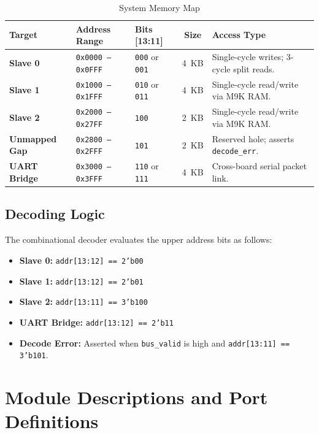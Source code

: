 \documentclass[11pt,a4paper]{article}
\begin{document}
\begin{table}[h!]
\centering
\caption{System Memory Map}
\label{tab:memory_allocation}
\small
\begin{tabularx}{\textwidth}{lllcX}
\toprule
\textbf{Target} & \textbf{Address Range} & \textbf{Bits [13:11]} & \textbf{Size} & \textbf{Access Type} \\
\midrule
\textbf{Slave 0} & \texttt{0x0000 -- 0x0FFF} & \texttt{000} or \texttt{001} & 4~KB & Single-cycle writes; 3-cycle split reads. \\
\textbf{Slave 1} & \texttt{0x1000 -- 0x1FFF} & \texttt{010} or \texttt{011} & 4~KB & Single-cycle read/write via M9K RAM. \\
\textbf{Slave 2} & \texttt{0x2000 -- 0x27FF} & \texttt{100} & 2~KB & Single-cycle read/write via M9K RAM. \\
\textbf{Unmapped Gap} & \texttt{0x2800 -- 0x2FFF} & \texttt{101} & 2~KB & Reserved hole; asserts \texttt{decode\_err}. \\
\textbf{UART Bridge} & \texttt{0x3000 -- 0x3FFF} & \texttt{110} or \texttt{111} & 4~KB & Cross-board serial packet link. \\
\bottomrule
\end{tabularx}
\end{table}

\subsection{Decoding Logic}
The combinational decoder evaluates the upper address bits as follows:
\begin{itemize}
    \item \textbf{Slave 0:} \texttt{addr[13:12] == 2'b00}
    \item \textbf{Slave 1:} \texttt{addr[13:12] == 2'b01}
    \item \textbf{Slave 2:} \texttt{addr[13:11] == 3'b100}
    \item \textbf{UART Bridge:} \texttt{addr[13:12] == 2'b11}
    \item \textbf{Decode Error:} Asserted when \texttt{bus\_valid} is high and \texttt{addr[13:11] == 3'b101}.
\end{itemize}

\section{Module Descriptions and Port Definitions}
\end{document}
